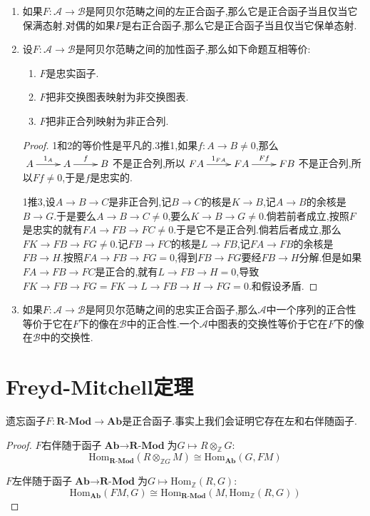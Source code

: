 \begin{enumerate}
\begin{proof}
    	上两条已经证明了2和3是等价的,4可推出2和3,2和3可推出1.于是我们仅需验证1推4.倘若$\ker g=\mathrm{im}f$,取$f$的像是$i$,取$g$的余像是$q$,那么$\ker q=\mathrm{im}i=i$.于是$(i,q)$是短正合列,于是$(Fi,Fq)$是短正合列,此即$(Ff,Fg)$是正合的.
    \end{proof}
    \item 如果$F:\mathscr{A}\to\mathscr{B}$是阿贝尔范畴之间的左正合函子,那么它是正合函子当且仅当它保满态射.对偶的如果$F$是右正合函子,那么它是正合函子当且仅当它保单态射.
    \item 设$F:\mathscr{A}\to\mathscr{B}$是阿贝尔范畴之间的加性函子,那么如下命题互相等价:
    \begin{enumerate}
    	\item $F$是忠实函子.
    	\item $F$把非交换图表映射为非交换图表.
    	\item $F$把非正合列映射为非正合列.
    \end{enumerate}
    \begin{proof}
    	
    	1和2的等价性是平凡的.3推1,如果$f:A\to B\not=0$,那么$\xymatrix{A\ar[r]^{1_A}&A\ar[r]^f&B}$不是正合列,所以$\xymatrix{FA\ar[r]^{1_{FA}}&FA\ar[r]^{Ff}&FB}$不是正合列,所以$Ff\not=0$,于是$f$是忠实的.
    	
    	\qquad
    	
    	1推3,设$A\to B\to C$是非正合列,记$B\to C$的核是$K\to B$,记$A\to B$的余核是$B\to G$.于是要么$A\to B\to C\not=0$,要么$K\to B\to G\not=0$.倘若前者成立,按照$F$是忠实的就有$FA\to FB\to FC\not=0$.于是它不是正合列.倘若后者成立,那么$FK\to FB\to FG\not=0$.记$FB\to FC$的核是$L\to FB$,记$FA\to FB$的余核是$FB\to H$.按照$FA\to FB\to FG=0$,得到$FB\to FG$要经$FB\to H$分解.但是如果$FA\to FB\to FC$是正合的,就有$L\to FB\to H=0$,导致$FK\to FB\to FG=FK\to L\to FB\to H\to FG=0$.和假设矛盾.
    \end{proof}
    \item 如果$F:\mathscr{A}\to\mathscr{B}$是阿贝尔范畴之间的忠实正合函子,那么$\mathscr{A}$中一个序列的正合性等价于它在$F$下的像在$\mathscr{B}$中的正合性.一个$\mathscr{A}$中图表的交换性等价于它在$F$下的像在$\mathscr{B}$中的交换性.
\end{enumerate}
\newpage
\section{Freyd-Mitchell定理}

遗忘函子$F:\textbf{R-Mod}\to\textbf{Ab}$是正合函子.事实上我们会证明它存在左和右伴随函子.
\begin{proof}
	
	$F$右伴随于函子$\textbf{Ab}\to\textbf{R-Mod}$为$G\mapsto R\otimes_{\mathbb{Z}}G$:
	$$\mathrm{Hom}_{\textbf{R-Mod}}(R\otimes_{\mathbb{Z}G}M)\cong\mathrm{Hom}_{\textbf{Ab}}(G,FM)$$
	
	$F$左伴随于函子$\textbf{Ab}\to\textbf{R-Mod}$为$G\mapsto\mathrm{Hom}_{\mathbb{Z}}(R,G)$:
	$$\mathrm{Hom}_{\textbf{Ab}}(FM,G)\cong\mathrm{Hom}_{\textbf{R-Mod}}(M,\mathrm{Hom}_{\mathbb{Z}}(R,G))$$
\end{proof}

